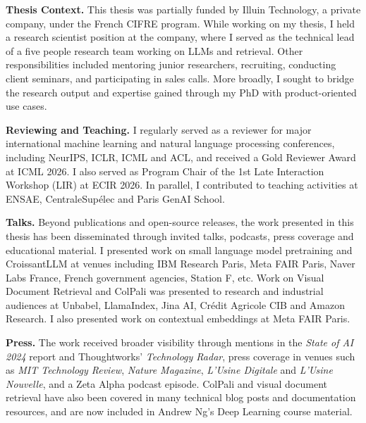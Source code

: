 \noindent\textbf{Thesis Context.}
This thesis was partially funded by Illuin Technology, a private company, under the French CIFRE program. While working on my thesis, I held a research scientist position at the company, where I served as the technical lead of a five people research team working on LLMs and retrieval. Other responsibilities included mentoring junior researchers, recruiting, conducting client seminars, and participating in sales calls. More broadly, I sought to bridge the research output and expertise gained through my PhD with product-oriented use cases.


\noindent\textbf{Reviewing and Teaching.}
I regularly served as a reviewer for major international machine learning and natural language processing conferences, including NeurIPS, ICLR, ICML and ACL, and received a Gold Reviewer Award at ICML 2026. I also served as Program Chair of the 1st Late Interaction Workshop (LIR) at ECIR 2026. In parallel, I contributed to teaching activities at ENSAE, CentraleSupélec and Paris GenAI School.


\noindent\textbf{Talks.}
Beyond publications and open-source releases, the work presented in this thesis has been disseminated through invited talks, podcasts, press coverage and educational material. I presented work on small language model pretraining and CroissantLLM at venues including IBM Research Paris, Meta FAIR Paris, Naver Labs France, French government agencies, Station F, etc. Work on Visual Document Retrieval and ColPali was presented to research and industrial audiences at Unbabel, LlamaIndex, Jina AI, Crédit Agricole CIB and Amazon Research. I also presented work on contextual embeddings at Meta FAIR Paris.

\noindent\textbf{Press.}
The work received broader visibility through mentions in the \emph{State of AI 2024} report and Thoughtworks' \emph{Technology Radar}, press coverage in venues such as \emph{MIT Technology Review}, \emph{Nature Magazine}, \emph{L'Usine Digitale} and \emph{L'Usine Nouvelle}, and a Zeta Alpha podcast episode. ColPali and visual document retrieval have also been covered in many technical blog posts and documentation resources, and are now included in Andrew Ng's Deep Learning course material.
